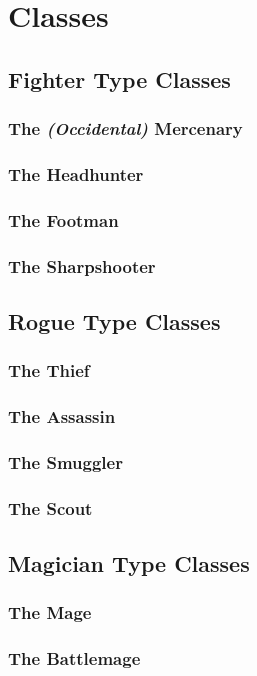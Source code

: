 \documentclass[openany,10pt,a4paper]{book}
\begin{document}
\chapter{Classes}
\section{Fighter Type Classes}
\subsection{The \textit{(Occidental)} Mercenary}
\subsection{The Headhunter}
\subsection{The Footman}
\subsection{The Sharpshooter}
\section{Rogue Type Classes}
\subsection{The Thief}
\subsection{The Assassin}
\subsection{The Smuggler}
\subsection{The Scout}
\section{Magician Type Classes}
\subsection{The Mage}
\subsection{The Battlemage}
\end{document}
